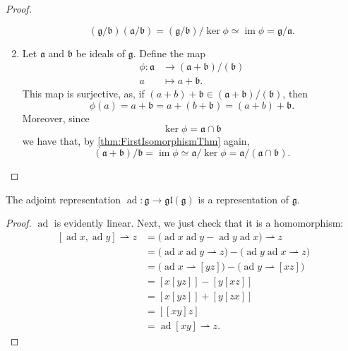 \documentclass{article}
\newcommand{\lb}[1]{\ensuremath{\left[{#1}\right]}}
\DeclareMathOperator{\im}{im}
\DeclareMathOperator{\ad}{ad}
\newcommand{\frka}{{\ensuremath{\mathfrak{a}}}}
\newcommand{\frkb}{{\ensuremath{\mathfrak{b}}}}
\newcommand{\frkg}{{\ensuremath{\mathfrak{g}}}}
\newcommand{\glalg}{\ensuremath{\mathfrak{gl}}}
\begin{document}
\begin{proof}
\begin{enumerate}[label=(\alph*)]
            \[
                (\frkg/\frkb)(\frka/\frkb)
                =
                (\frkg/\frkb)/\ker\phi
                \simeq
                \im\phi
                =
                \frkg/\frka.
            \]
        \item 
            Let $\frka$ and $\frkb$ be ideals of $\frkg$.
            Define the map
            \begin{align*}
                \phi:
                \frka 
                &\to 
                (\frka+\frkb)/(\frkb)
                \\
                a
                &\mapsto
                a + \frkb.
            \end{align*}
            This map is surjective, as, if $(a + b) + \frkb \in (\frka+\frkb)/(\frkb)$, then
            \[
                \phi(a)
                =
                a + \frkb
                =
                a + (b + \frkb)
                =
                (a + b) + \frkb.
            \]
            Moreover, since
            \[
                \ker \phi
                =
                \frka \cap \frkb
            \]
            we have that, by \ref{thm:FirstIsomorphismThm} again,
            \[
                (\frka+\frkb)/\frkb
                =
                \im \phi
                \simeq
                \frka/\ker\phi
                =
                \frka/(\frka \cap \frkb).
            \]
    \end{enumerate}
\end{proof}

\begin{theorem}
    The adjoint representation $\ad: \frkg \to \glalg(\frkg)$ is a representation of $\frkg$.
\end{theorem}

\begin{proof}
    $\ad$ is evidently linear.
    Next, we just check that it is a homomorphism:
    \begin{align*}
        \lb{\ad x, \ad y} \rightharpoonup z
        &=
        \Big(\ad x \ad y - \ad y \ad x\Big) \rightharpoonup z 
        \\
        &=
        \Big(\ad x \ad y \rightharpoonup z\Big) - \Big(\ad y \ad x \rightharpoonup z\Big) 
        \\
        &=
        \Big(
            \ad x \rightharpoonup \lb{yz}
        \Big)
        - 
        \Big(
            \ad y \rightharpoonup \lb{xz}
        \Big)
        \\
        &=
        \lb{x\lb{yz}} - \lb{y\lb{xz}}
        \\
        &=
        \lb{x\lb{yz}} + \lb{y\lb{zx}}
        \\
        &=
        \lb{\lb{xy}z}
        \\
        &=
        \ad \lb{xy} \rightharpoonup z.
    \end{align*}
\end{proof}
\end{document}
